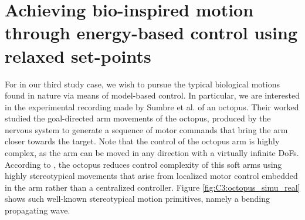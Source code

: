 \section[Achieving bio-inspired motion through energy-based control]{Achieving bio-inspired motion through energy-based control using relaxed set-points}
For in our third study case, we wish to pursue the typical biological motions found in nature via means of model-based control. In particular, we are interested in the experimental recording made by Sumbre et al. \cite{Sumbre2001Sep} of an octopus. Their worked studied the goal-directed arm movements of the octopus, produced by the nervous system to generate a sequence of motor commands that bring the arm closer towards the target. Note that the control of the octopus arm is highly complex, as the arm can be moved in any direction with a virtually infinite DoFs. According to \cite{Sumbre2001Sep}, the octopus reduces control complexity of this soft arms using highly stereotypical movements that arise from localized motor control embedded in the arm rather than a centralized controller. %
Figure \ref{fig:C3:octopus_simu_real} shows such well-known stereotypical motion primitives, namely a bending propagating wave. 

